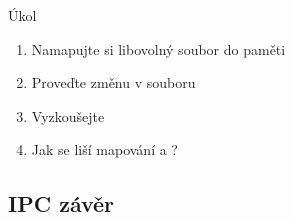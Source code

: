 \begin{frame}{Úkol}

  \begin{enumerate}
    \item Namapujte si libovolný soubor do paměti
    \item Proveďte změnu v souboru
    \item Vyzkoušejte
    \item Jak se liší mapování  a ?
  \end{enumerate}

\end{frame}

\subsection*{IPC závěr}
\frame{\subsectionpage}

